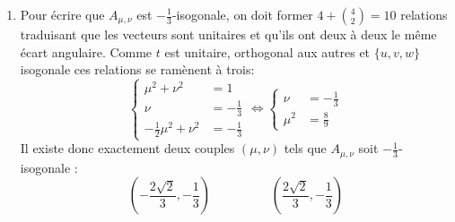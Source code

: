 \begin{enumerate}
 \item Pour écrire que $A_{\mu,\nu}$ est $-\frac{1}{3}$-isogonale, on doit former $4+\binom{4}{2}=10$ relations traduisant que les vecteurs sont unitaires et qu'ils ont deux à deux le même écart angulaire. Comme $t$ est unitaire, orthogonal aux autres et $\{u,v,w\}$ isogonale ces relations se ramènent à  trois:
\begin{displaymath}
 \left\lbrace 
\begin{aligned}
 \mu^2+ \nu^2 &= 1\\
\nu &= -\frac{1}{3}\\
-\frac{1}{2}\mu^2+\nu^2 &= -\frac{1}{3}
\end{aligned}
\right. 
\Leftrightarrow
\left\lbrace 
\begin{aligned}
 \nu &= -\frac{1}{3}\\
 \mu^2 &= \frac{8}{9}
\end{aligned}
\right. 
\end{displaymath}
Il existe donc exactement deux couples $(\mu,\nu)$ tels que $A_{\mu,\nu}$ soit $-\frac{1}{3}$-isogonale :
\begin{displaymath}
 (-\frac{2\sqrt{2}}{3},-\frac{1}{3})\hspace{2cm} (\frac{2\sqrt{2}}{3},-\frac{1}{3})
\end{displaymath}

\end{enumerate}

